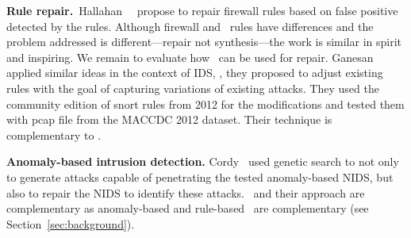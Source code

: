 \documentclass[conference]{IEEEtran}
\begin{document}
\noindent
\textbf{Rule repair.}~Hallahan~\etal{}~\cite{8102263} propose to
repair firewall rules based on false positive detected by the
rules. Although firewall and \nids\ rules have differences and the
problem addressed is different---repair not synthesis---the work is
similar in spirit and inspiring. We remain to evaluate how \tname\ can
be used for repair.  Ganesan \etal{}\cite{ganesan} applied similar
ideas in the context of IDS, \ie{}, they proposed to adjust existing
rules with the goal of capturing variations of existing attacks. They
used the community edition of snort rules from 2012 for the
modifications and tested them with pcap file from the MACCDC 2012
dataset. Their technique is complementary to \tname{}.

\noindent
\textbf{Anomaly-based intrusion detection.}
Cordy~\etal{}\cite{cordy-etal-issta19} used genetic search to not only
to generate attacks capable of penetrating the tested anomaly-based
NIDS, but also to repair the NIDS to identify these
attacks. \tname\ and their approach are complementary as anomaly-based
and rule-based \nids\ are complementary (see
Section~\ref{sec:background}).


\noindent



\end{document}
